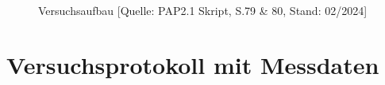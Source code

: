 \documentclass{article}
\begin{document}
\begin{figure}[!bp]
  \centering
  \hfill
  \hfill
  \caption{Versuchsaufbau [Quelle: PAP2.1 Skript, S.79 \& 80, Stand: 02/2024]}
  \label{fig:Aufbau}
\end{figure}


\clearpage
\newpage

\section{Versuchsprotokoll mit Messdaten}
\end{document}
